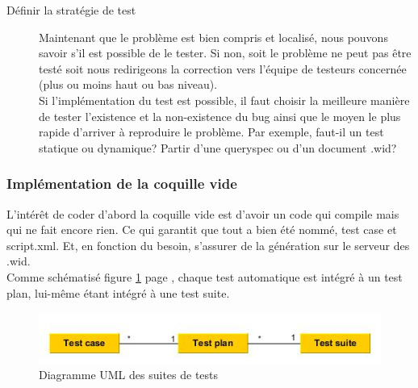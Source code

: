 \begin{description}
	\item[D\'{e}finir la strat\'{e}gie de test] Maintenant que le probl\`{e}me est bien compris et localis\'{e}, nous pouvons savoir s'il est possible de le tester. Si non, soit le probl\`{e}me ne peut pas \^{e}tre test\'{e} soit nous redirigeons la correction vers l'\'{e}quipe de testeurs concern\'{e}e (plus ou moins haut ou bas niveau).\\
Si l'impl\'{e}mentation du test est possible, il faut choisir la meilleure mani\`{e}re de tester l'existence et la non-existence du bug ainsi que le moyen le plus rapide d'arriver \`{a} reproduire le probl\`{e}me. Par exemple, faut-il un test statique ou dynamique? Partir d'une queryspec ou d'un document .wid?
\end{description}


\subsubsection{Impl\'{e}mentation de la coquille vide}
L'int\'{e}r\^{e}t de coder d'abord la coquille vide est d'avoir un code qui compile mais qui ne fait encore rien. Ce qui garantit que tout a bien été nommé, test case et script.xml. Et, en fonction du besoin, s'assurer de la g\'{e}n\'{e}ration sur le serveur des .wid.\\ 
Comme sch\'{e}matis\'{e} figure \ref{figure:testsRelations} page \pageref{figure:testsRelations}, chaque test automatique est int\'{e}gr\'{e} \`{a} un test plan, lui-m\^{e}me \'{e}tant int\'{e}gr\'{e} \`{a} une test suite.\\
\begin{figure}[!ht]
  \centering
      \includegraphics[width=\textwidth]{images/testsRelations.jpg}
  \caption{Diagramme UML des suites de tests}
	\label{figure:testsRelations}
\end{figure}

